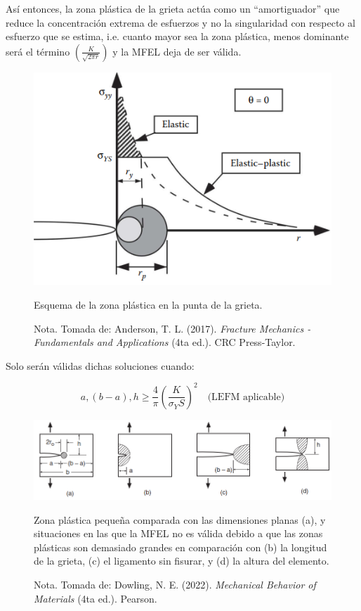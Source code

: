 \documentclass[12pt,letterpaper]{article}
\begin{document}
Así entonces, la zona plástica de la grieta actúa como un “amortiguador” que reduce la concentración extrema de esfuerzos y no la singularidad con respecto al esfuerzo que se estima, i.e.
cuanto mayor sea la zona plástica, menos dominante será el término $\left(\frac{K}{\sqrt{2\pi r}}\right)$ y la MFEL deja de ser válida.
\begin{figure}[H]
    \centering
    \includegraphics[width=0.7\linewidth]{ee.png} %
    \caption{Esquema de la zona plástica en la punta de la grieta.}
    \label{fig:zona_plastica}
    \caption*{Nota. Tomada de: Anderson, T. L. (2017). \textit{Fracture Mechanics - Fundamentals and Applications} (4ta ed.). CRC Press-Taylor.}
\end{figure}
\newpage
Solo serán válidas dichas soluciones cuando:

\[
a, (b-a), h \geq \frac{4}{\pi} \left( \frac{K}{\sigma_YS} \right)^2 \quad \text{(LEFM aplicable)}
\]

\begin{figure}[H]
    \centering
    \includegraphics[width=0.9\linewidth]{ff.png} %
        \caption{Zona plástica pequeña comparada con las dimensiones planas (a), y situaciones en las que la MFEL no es válida debido a que las zonas plásticas son demasiado grandes en comparación con (b) la longitud de la grieta, (c) el ligamento sin fisurar, y (d) la altura del elemento.}
    \label{fig:zona_plastica_comparacion}
        \caption*{Nota. Tomada de: Dowling, N. E. (2022). \textit{Mechanical Behavior of Materials} (4ta ed.). Pearson.}
    \end{figure}
\end{document}
